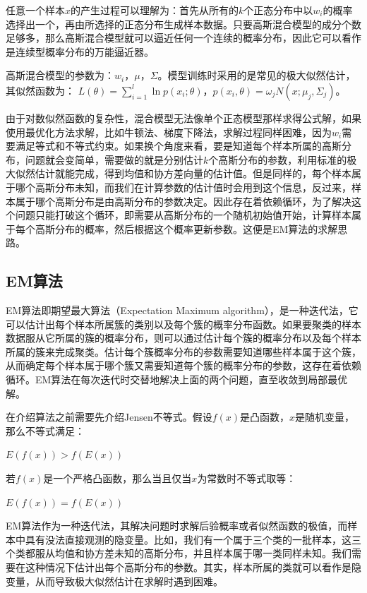 \documentclass[a4paper,12pt,openany,oneside,utf-8]{ctexbook}
\begin{document}
    任意一个样本$x$的产生过程可以理解为：首先从所有的$k$个正态分布中以$w_i$的概率选择出一个，再由所选择的正态分布生成样本数据。只要高斯混合模型的成分个数足够多，那么高斯混合模型就可以逼近任何一个连续的概率分布，因此它可以看作是连续型概率分布的万能逼近器。
    
    高斯混合模型的参数为：$w_i$，$\mu$，$\Sigma$。模型训练时采用的是常见的极大似然估计，其似然函数为：
    $L(\theta)=\sum_{i=1}^{l}\ln p(x_i;\theta)$，$p(x_i,\theta)=\omega_jN(x;\mu_j,\Sigma_j)$。
    
    由于对数似然函数的复杂性，混合模型无法像单个正态模型那样求得公式解，如果使用最优化方法求解，比如牛顿法、梯度下降法，求解过程同样困难，因为$w_i$需要满足等式和不等式约束。如果换个角度来看，要是知道每个样本所属的高斯分布，问题就会变简单，需要做的就是分别估计$k$个高斯分布的参数，利用标准的极大似然估计就能完成，得到均值和协方差向量的估计值。但是同样的，每个样本属于哪个高斯分布未知，而我们在计算参数的估计值时会用到这个信息，反过来，样本属于哪个高斯分布是由高斯分布的参数决定。因此存在着依赖循环，为了解决这个问题只能打破这个循环，即需要从高斯分布的一个随机初始值开始，计算样本属于每个高斯分布的概率，然后根据这个概率更新参数。这便是EM算法的求解思路。
    
    \subsection{EM算法}
    
    EM算法\cite{ref24}即期望最大算法（Expectation Maximum algorithm），是一种迭代法，它可以估计出每个样本所属簇的类别以及每个簇的概率分布函数。如果要聚类的样本数据服从它所属的簇的概率分布，则可以通过估计每个簇的概率分布以及每个样本所属的簇来完成聚类。估计每个簇概率分布的参数需要知道哪些样本属于这个簇，从而确定每个样本属于哪个簇又需要知道每个簇的概率分布的参数，这存在着依赖循环。EM算法在每次迭代时交替地解决上面的两个问题，直至收敛到局部最优解。
    
	在介绍算法之前需要先介绍Jensen不等式。假设$f(x)$是凸函数，$x$是随机变量，那么不等式满足：
    \begin{center}
        $E (f(x))>f (E(x))$
    \end{center}
	
	若$f(x)$是一个严格凸函数，那么当且仅当$x$为常数时不等式取等：
    \begin{center}
        $E (f(x))=f (E(x))$
    \end{center}
    
	EM算法作为一种迭代法，其解决问题时求解后验概率或者似然函数的极值，而样本中具有没法直接观测的隐变量。比如，我们有一个属于三个类的一批样本，这三个类都服从均值和协方差未知的高斯分布，并且样本属于哪一类同样未知。我们需要在这种情况下估计出每个高斯分布的参数。其实，样本所属的类就可以看作是隐变量，从而导致极大似然估计在求解时遇到困难。
    
\end{document}
